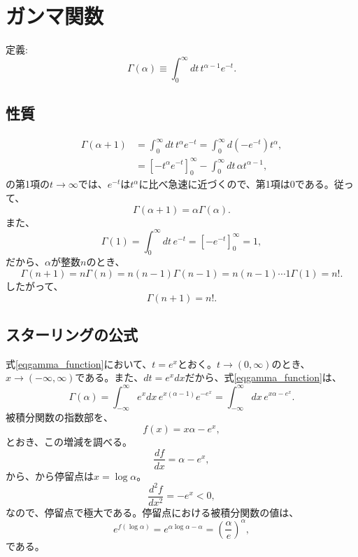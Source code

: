 \section{ガンマ関数}
定義:
\begin{equation}
\Gamma(\alpha)\equiv\int_0^{\infty}dt\,t^{\alpha-1}e^{-t}.\label{eqgamma_function}
\end{equation}
\subsection{性質}
\begin{align}
 \Gamma(\alpha +1) &= \int_0^{\infty}dt\,t^{\alpha}e^{-t}=\int_0^{\infty}d(-e^{-t})t^\alpha,\\
&= \left[-t^\alpha e^{-t}\right]_0^{\infty}-\int_0^{\infty}dt\, \alpha t^{\alpha-1},
\end{align}
の第1項の$t\rightarrow\infty$では、$e^{-t}$は$t^\alpha$に比べ急速に近づくので、第1項は0である。従って、
\begin{equation}
 \Gamma(\alpha +1) =\alpha\Gamma(\alpha).
\end{equation}
また、
\begin{equation}
 \Gamma(1)=\int_0^{\infty}dt\, e^{-t}=\left[-e^{-t}\right]_0^\infty=1,
\end{equation}
だから、$\alpha$が整数$n$のとき、
\begin{equation}
 \Gamma(n+1)=n\Gamma(n)=n(n-1)\Gamma(n-1)=n(n-1)\cdots 1\Gamma(1)=n!.
\end{equation}
したがって、
\begin{equation}
 \Gamma(n+1)=n!.
\end{equation}

\subsection{スターリングの公式}
式\eqref{eqgamma_function}において、$t=e^x$とおく。$t\rightarrow(0,\infty)$のとき、$x\rightarrow(-\infty, \infty)$である。また、$dt=e^xdx$だから、式\eqref{eqgamma_function}は、
\begin{equation}
 \Gamma(\alpha)=\int_{-\infty}^\infty e^xdx\, e^{x(\alpha-1)}e^{-e^x}=\int_{-\infty}^\infty dx\, e^{x\alpha-e^x}.\label{eq:gamma_function2}
\end{equation}
被積分関数の指数部を、
\begin{equation}
 f(x)=x\alpha-e^x,
\end{equation}
とおき、この増減を調べる。
\begin{equation}
 \dfrac{df}{dx}=\alpha-e^x,
\end{equation}
から、から停留点は$x=\log\alpha$。
\begin{equation}
 \dfrac{d^2f}{dx^2}=-e^x<0,
\end{equation}
なので、停留点で極大である。停留点における被積分関数の値は、
\begin{equation}
 e^{f(\log\alpha)}=e^{\alpha\log\alpha -\alpha}=\left(\dfrac{\alpha}{e}\right)^\alpha,
\end{equation}
である。

